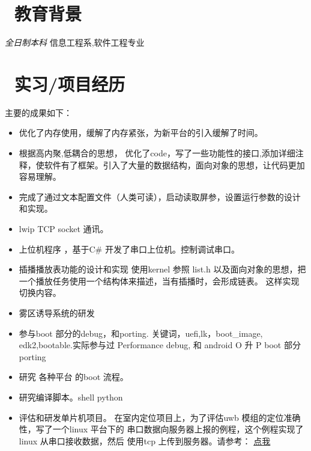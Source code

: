 \documentclass[a4paper,8pt,oneside]{resume}
\begin{document}

 
\section{\faGraduationCap\  教育背景}
\textit{全日制本科}
信息工程系,软件工程专业

\section{\faUsers\ 实习/项目经历}




主要的成果如下：
\begin{itemize}
  \item 优化了内存使用，缓解了内存紧张，为新平台的引入缓解了时间。
  \item 根据高内聚,低耦合的思想， 优化了code，写了一些功能性的接口,添加详细注释，使软件有了框架。引入了大量的数据结构，面向对象的思想，让代码更加容易理解。
  \item 完成了通过文本配置文件（人类可读），启动读取屏参，设置运行参数的设计和实现。
  \item lwip  TCP  socket 通讯。
  \item 上位机程序 ，基于C\# 开发了串口上位机。控制调试串口。
  \item 插播播放表功能的设计和实现
  使用kernel 参照 list.h 以及面向对象的思想，把一个播放任务使用一个结构体来描述，当有插播时，会形成链表。 这样实现切换内容。
  \item 雾区诱导系统的研发
\end{itemize}

\begin{itemize}
  \item 参与boot 部分的debug，和porting. 关键词，uefi,lk，boot\_image, edk2,bootable.实际参与过 Performance debug, 和 android O 升 P boot 部分 porting
  \item 研究 各种平台 的boot 流程。
  \item 研究编译脚本。shell python
  \item 评估和研发单片机项目。
  在室内定位项目上，为了评估uwb 模组的定位准确性，写了一个linux 平台下的 串口数据向服务器上报的例程，这个例程实现了linux 从串口接收数据，然后
  使用tcp 上传到服务器。请参考： \href{https://github.com/haobogao/mid_report}{ 点我 }  
  
\end{itemize}
\end{document}
